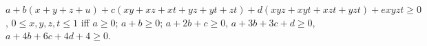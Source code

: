 $a + b(x + y + z + u) + c(xy + xz + xt + yz + yt + zt) + d(xyz + xyt + xzt + yzt) + exyzt \geq 0$, $0 \leq x, y, z, t \leq 1$ iff $a \geq 0$; $a + b \geq 0$; $a + 2b + c \geq 0$, $a + 3b + 3c + d \geq 0$, $a + 4b + 6c + 4d + 4 \geq 0$.
